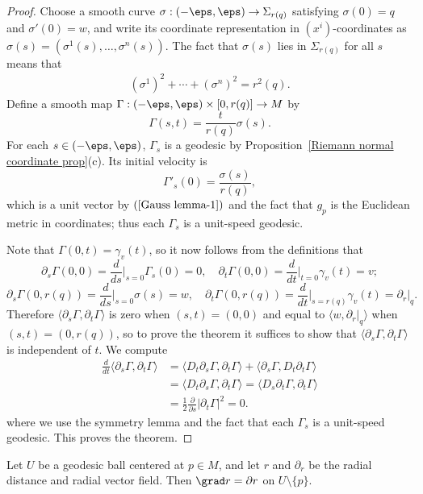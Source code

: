 \begin{proof}
Choose a smooth curve $\sigma:(-\eps,\eps)\to\Sigma_{r(q)}$ satisfying $\sigma(0)=q$ and $\sigma'(0)=w$, and write its coordinate representation in $(x^i)$-coordinates as $\sigma(s)=(\sigma^1(s),\dots,\sigma^n(s))$. The fact that $\sigma(s)$ lies in $\Sigma_{r(q)}$ for all $s$ means that 
\begin{align}\label{Gauss lemma-1}
(\sigma^1)^2+\cdots+(\sigma^n)^2=r^2(q).
\end{align}
Define a smooth map $\Gamma:(-\eps,\eps)\times[0,r(q)]\to M$ by
\[\Gamma(s,t)=\frac{t}{r(q)}\sigma(s).\]
For each $s\in(-\eps,\eps)$, $\Gamma_s$ is a geodesic by Proposition~\ref{Riemann normal coordinate prop}(c). Its initial velocity is 
\[\Gamma'_s(0)=\frac{\sigma(s)}{r(q)},\]
which is a unit vector by $(\ref{Gauss lemma-1})$ and the fact that $g_p$ is the Euclidean metric in coordinates; thus each $\Gamma_s$ is a unit-speed geodesic.\par
Note that $\Gamma(0,t)=\gamma_v(t)$, so it now follows from the definitions that
\[\partial_s\Gamma(0,0)=\frac{d}{ds}\Big|_{s=0}\Gamma_s(0)=0,\quad \partial_t\Gamma(0,0)=\frac{d}{dt}\Big|_{t=0}\gamma_v(t)=v;\]
\[\partial_s\Gamma(0,r(q))=\frac{d}{ds}\Big|_{s=0}\sigma(s)=w,\quad \partial_t\Gamma(0,r(q))=\frac{d}{dt}\Big|_{s=r(q)}\gamma_v(t)=\partial_r|_q.\]
Therefore $\langle\partial_s\Gamma,\partial_t\Gamma\rangle$ is zero when $(s,t)=(0,0)$ and equal to $\langle w,\partial_r|_q\rangle$ when $(s,t)=(0,r(q))$, so to prove the theorem it suffices to show that 
$\langle\partial_s\Gamma,\partial_t\Gamma\rangle$ is independent of $t$. We compute
\begin{equation}\label{Guass lemma-1}
\begin{aligned}
\frac{d}{dt}\langle\partial_s\Gamma,\partial_t\Gamma\rangle&=\langle D_t\partial_s\Gamma,\partial_t\Gamma\rangle+\langle\partial_s\Gamma,D_t\partial_t\Gamma\rangle\\
&=\langle D_t\partial_s\Gamma,\partial_t\Gamma\rangle=\langle D_s\partial_t\Gamma,\partial_t\Gamma\rangle\\
&=\frac{1}{2}\frac{\partial}{\partial s}|\partial_t\Gamma|^2=0.
\end{aligned}
\end{equation}
where we use the symmetry lemma and the fact that each $\Gamma_s$ is a unit-speed geodesic. This proves the theorem.
\end{proof}
\begin{corollary}\label{Riemann radial distance grad}
Let $U$ be a geodesic ball centered at $p\in M$, and let $r$ and $\partial_r$ be the radial distance and radial vector field. Then $\grad r=\partial r$ on $U\setminus\{p\}$.
\end{corollary}

